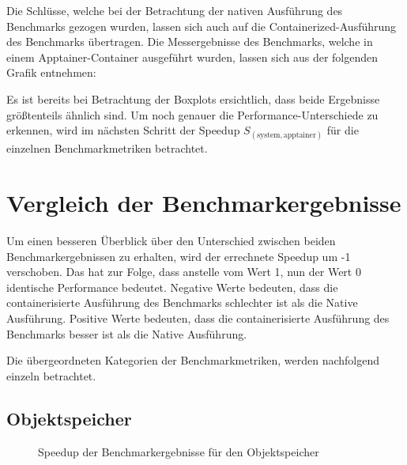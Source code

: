 Die Schlüsse, welche bei der Betrachtung der nativen Ausführung des Benchmarks gezogen wurden, lassen sich auch auf die Containerized-Ausführung des Benchmarks übertragen. Die Messergebnisse des Benchmarks, welche in einem Apptainer-Container ausgeführt wurden, lassen sich aus der folgenden Grafik entnehmen:




Es ist bereits bei Betrachtung der Boxplots ersichtlich, dass beide Ergebnisse größtenteils ähnlich sind. Um noch genauer die Performance-Unterschiede zu erkennen, wird im nächsten Schritt der Speedup $S_(\text{system}, \text{apptainer})$ für die einzelnen Benchmarkmetriken betrachtet.

\section{Vergleich der Benchmarkergebnisse}

Um einen besseren Überblick über den Unterschied zwischen beiden Benchmarkergebnissen zu erhalten, wird der errechnete Speedup um -1 verschoben. Das hat zur Folge, dass anstelle vom Wert 1, nun der Wert 0 identische Performance bedeutet. 
Negative Werte bedeuten, dass die containerisierte Ausführung des Benchmarks schlechter ist als die Native Ausführung. Positive Werte bedeuten, dass die containerisierte Ausführung des Benchmarks besser ist als die Native Ausführung. 

Die übergeordneten Kategorien der Benchmarkmetriken, werden nachfolgend einzeln betrachtet.

\subsection{Objektspeicher}

\begin{figure}
    \centering
    
    \caption{Speedup der Benchmarkergebnisse für den Objektspeicher}
    \label{fig:speedup_object}
\end{figure}

\FloatBarrier

